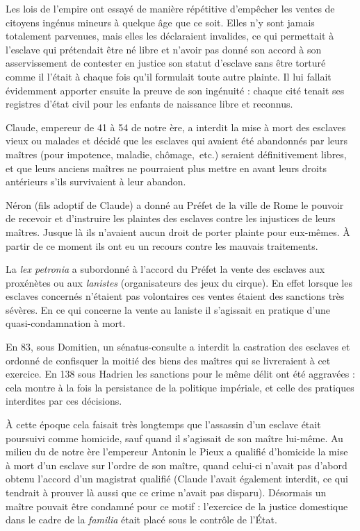  Les lois de l'empire ont essayé de manière répétitive d'empêcher les ventes de citoyens ingénus mineurs à quelque âge que ce soit. Elles n'y sont jamais totalement parvenues, mais elles les déclaraient invalides, ce qui permettait à l'esclave qui prétendait être né libre et n'avoir pas donné son accord à son asservissement de contester en justice son statut d'esclave sans être torturé comme il l'était à chaque fois qu'il formulait toute autre plainte. Il lui fallait évidemment apporter ensuite la preuve de son ingénuité : chaque cité tenait ses registres d'état civil pour les enfants de naissance libre et reconnus.

 Claude, empereur de 41 à 54 de notre ère, a interdit la mise à mort des esclaves vieux ou malades et décidé que les esclaves qui avaient été abandonnés par leurs maîtres (pour impotence, maladie, chômage,~etc.) seraient définitivement libres, et que leurs anciens maîtres ne pourraient plus mettre en avant leurs droits antérieurs s'ils survivaient à leur abandon. 

 Néron (fils adoptif de Claude) a donné au Préfet de la ville de Rome le pouvoir de recevoir et d'instruire les plaintes des esclaves contre les injustices de leurs maîtres. Jusque là ils n'avaient aucun droit de porter plainte pour eux-mêmes. À partir de ce moment ils ont eu un recours contre les mauvais traitements.

 La \emph{lex petronia} a subordonné à l'accord du Préfet la vente des esclaves aux proxénètes ou aux \emph{lanistes} (organisateurs des jeux du cirque). En effet lorsque les esclaves concernés n'étaient pas volontaires ces ventes étaient des sanctions très sévères. En ce qui concerne la vente au laniste il s'agissait en pratique d'une quasi-condamnation à mort.

 En 83, sous Domitien, un sénatus-consulte a interdit la castration des esclaves et ordonné de confisquer la moitié des biens des maîtres qui se livreraient à cet exercice. En 138 sous Hadrien les sanctions pour le même délit ont été aggravées : cela montre à la fois la persistance de la politique impériale, et celle des pratiques interdites par ces décisions. 

 À cette époque cela faisait très longtemps que l'assassin d'un esclave était poursuivi comme homicide, sauf quand il s'agissait de son maître lui-même. Au milieu du  de notre ère l'empereur Antonin le Pieux a qualifié d'homicide la mise à mort d'un esclave sur l'ordre de son maître, quand celui-ci n'avait pas d'abord obtenu l'accord d'un magistrat qualifié (Claude l'avait également interdit, ce qui tendrait à prouver là aussi que ce crime n'avait pas disparu). Désormais un maître pouvait être condamné pour ce motif : l'exercice de la justice domestique dans le cadre de la \emph{familia} était placé sous le contrôle de l'État.

